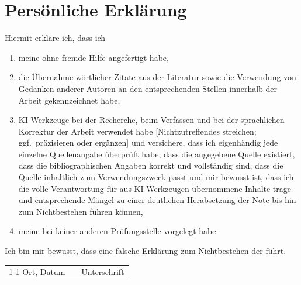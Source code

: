 \section*{Persönliche Erklärung}

Hiermit erkläre ich, dass ich
\begin{enumerate}
\item
  meine \varArbeit{} ohne fremde Hilfe angefertigt
  habe,
\item
  die Übernahme wörtlicher Zitate aus der Literatur sowie die Verwendung von
  Gedanken anderer Autoren an den entsprechenden Stellen innerhalb der Arbeit
  gekennzeichnet habe,
\item
  KI-Werkzeuge bei der Recherche, beim Verfassen und bei der sprachlichen Korrektur der Arbeit verwendet habe [Nichtzutreffendes streichen; ggf.\ präzisieren oder ergänzen] und versichere, dass ich eigenhändig jede einzelne Quellenangabe überprüft habe, dass die angegebene Quelle existiert, dass die bibliographischen Angaben korrekt und vollständig sind, dass die Quelle inhaltlich zum Verwendungszweck passt und mir bewusst ist, dass ich die volle Verantwortung für aus KI-Werkzeugen übernommene Inhalte trage und entsprechende Mängel zu einer deutlichen Herabsetzung der Note bis hin zum Nichtbestehen führen können,

\item
  meine \varArbeit{} bei keiner anderen Prüfungsstelle
  vorgelegt habe.
\end{enumerate}

\noindent
Ich bin mir bewusst, dass eine falsche Erklärung zum Nichtbestehen
der \varArbeit{} führt.

\vspace{2cm}

\begin{tabular}{lp{2em}l}
 \hspace{5cm}   && \hspace{3cm} \\\cline{1-1}\cline{3-3}
 Ort, Datum     && Unterschrift
\end{tabular}
